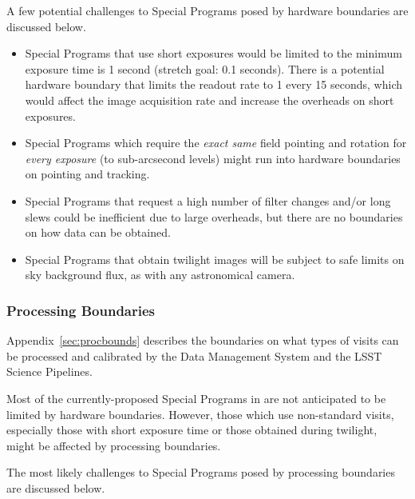 A few potential challenges to Special Programs posed by hardware
boundaries are discussed below.

\begin{itemize}

\item Special Programs that use short exposures would be limited to the
minimum exposure time is 1 second (stretch goal: 0.1 seconds).
There is a potential hardware boundary that limits the readout rate to 1 
every 15 seconds, which would affect the image acquisition rate and 
increase the overheads on short exposures.

\item Special Programs which require the \emph{exact same} field pointing and 
rotation for \emph{every exposure} (to sub-arcsecond levels) might run 
into hardware boundaries on pointing and tracking.

\item Special Programs that request a high number of filter changes and/or long 
slews could be inefficient due to large overheads, but there are no
boundaries on how data can be obtained.

\item Special Programs that obtain twilight images will be subject to safe
limits on sky background flux, as with any astronomical camera.

\end{itemize}

\subsubsection{Processing Boundaries}\label{ssec:proc_bounds_processing}

Appendix~\ref{sec:procbounds} describes the boundaries on what types of visits 
can be processed and calibrated by the Data Management System and the LSST
Science Pipelines.

Most of the currently-proposed Special Programs in 
are not anticipated to be limited by hardware boundaries.
However, those which use non-standard visits, especially those with
short exposure time or those obtained during twilight, might
be affected by processing boundaries.

The most likely challenges to Special Programs posed by processing
boundaries are discussed below.

